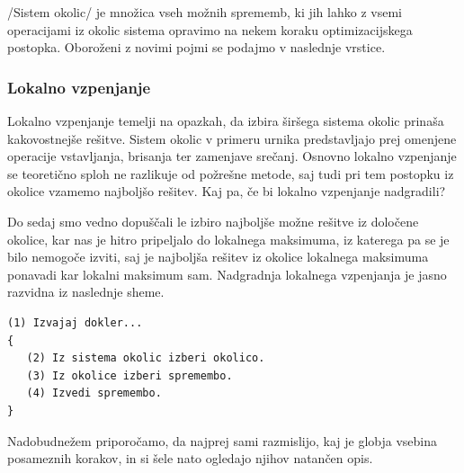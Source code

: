 \documentclass[10pt,a4paper]{article}
\begin{document}
/Sistem okolic/ je množica vseh možnih sprememb, ki jih lahko z vsemi operacijami iz
okolic sistema opravimo na nekem koraku optimizacijskega postopka. Oboroženi z novimi pojmi
se podajmo v naslednje vrstice.

\subsubsection{Lokalno vzpenjanje} %

Lokalno vzpenjanje temelji na opazkah, da izbira širšega sistema okolic prinaša kakovostnejše
rešitve. Sistem okolic v primeru urnika predstavljajo prej omenjene operacije vstavljanja,
brisanja ter zamenjave srečanj. Osnovno lokalno vzpenjanje se teoretično sploh ne razlikuje
od požrešne metode, saj tudi pri tem postopku iz okolice vzamemo najboljšo rešitev. Kaj pa,
če bi lokalno vzpenjanje nadgradili?

Do sedaj smo vedno dopuščali le izbiro najboljše možne rešitve iz določene okolice, kar nas
je hitro pripeljalo do lokalnega maksimuma, iz katerega pa se je bilo nemogoče izviti, saj
je najboljša rešitev iz okolice lokalnega maksimuma ponavadi kar lokalni maksimum sam.
Nadgradnja lokalnega vzpenjanja je jasno razvidna iz naslednje sheme.

\begin{verbatim}
(1) Izvajaj dokler...
{
   (2) Iz sistema okolic izberi okolico.
   (3) Iz okolice izberi spremembo.
   (4) Izvedi spremembo.
}
\end{verbatim}

Nadobudnežem priporočamo, da najprej sami razmislijo, kaj je globja vsebina posameznih
korakov, in si šele nato ogledajo njihov natančen opis.
\end{document}

